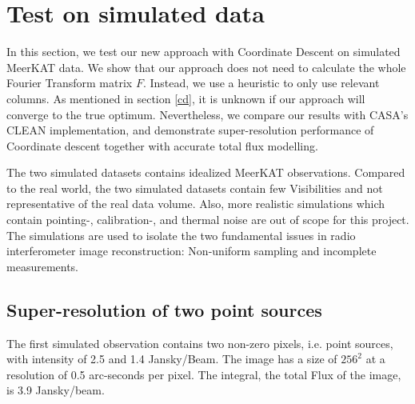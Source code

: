 \section{Test on simulated data}\label{results}
In this section, we test our new approach with Coordinate Descent on simulated MeerKAT data. We show that our approach does not need to calculate the whole Fourier Transform matrix $F$. Instead, we use a heuristic to only use relevant columns. As mentioned in section \ref{cd}, it is unknown if our approach will converge to the true optimum. Nevertheless, we compare our results with CASA's CLEAN implementation, and demonstrate super-resolution performance of Coordinate descent together with accurate total flux modelling.

The two simulated datasets contains idealized MeerKAT observations. Compared to the real world, the two simulated datasets contain few Visibilities and not representative of the real data volume. Also, more realistic simulations which contain pointing-, calibration-, and thermal noise are out of scope for this project. The simulations are used to isolate the two fundamental issues in radio interferometer image reconstruction: Non-uniform sampling and incomplete measurements.

\subsection{Super-resolution of two point sources}
The first simulated observation contains two non-zero pixels, i.e. point sources, with intensity of 2.5 and 1.4 Jansky/Beam. The image has a size of $256^2$ at a resolution of 0.5 arc-seconds per pixel. The integral, the total Flux of the image, is 3.9 Jansky/beam.

